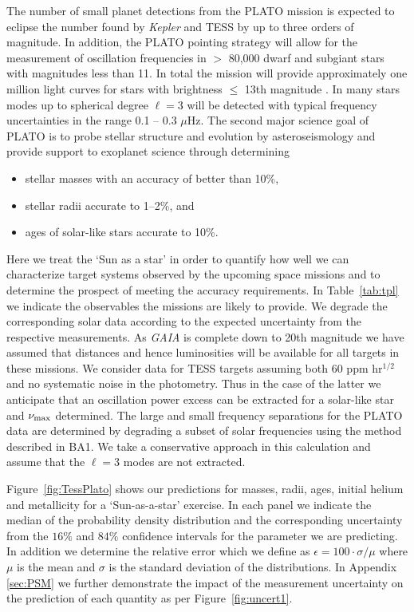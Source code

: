 The number of small planet detections from the PLATO mission is expected to eclipse the number found by \emph{Kepler}
and TESS by up to three orders of magnitude. In addition, the PLATO pointing strategy will allow for the measurement of oscillation frequencies in $>$ 80,000 dwarf and subgiant stars with magnitudes less than 11.  In total the mission will provide approximately one million light curves for stars with brightness $\le$ 13th magnitude \citep{2014ExA....38..249R}. In many stars modes up to spherical degree $\ell =3$ will be detected with typical frequency uncertainties in the range  0.1 -- 0.3 $\mu$Hz. The second major science goal of PLATO is to 
probe stellar structure and evolution by asteroseismology and provide support to exoplanet science through determining
\begin{itemize}
\item stellar masses with an accuracy of better than 10\%,
\item stellar radii accurate to 1--2\%, and
\item ages of solar-like stars accurate to 10\%.
\end{itemize}

Here we treat the `Sun as a star' in order to quantify how well we can characterize target systems observed by the 
upcoming space missions and to determine the prospect of meeting the accuracy requirements.  
In Table~\ref{tab:tpl} we indicate the observables the missions are likely to provide. 
We degrade the corresponding solar data according to the expected uncertainty from the respective measurements.   
As \emph{GAIA} is complete down to 20th magnitude we have assumed that distances and hence luminosities will be available for all targets in these missions. We consider data for TESS targets assuming both 60 ppm hr$^{1/2}$ and no systematic noise in the photometry. Thus in the case of the latter we anticipate that an oscillation power excess can be extracted for a solar-like star and $\nu_{\rm{max}}$ determined. The large and small frequency separations for the PLATO data are determined by degrading a subset of solar frequencies using the method described in BA1. We take a conservative approach in this calculation and assume that the $\ell=3$ modes are not extracted.

Figure~\ref{fig:TessPlato} shows our predictions for masses, radii, ages, initial helium and metallicity for a `Sun-as-a-star' exercise. In each panel we indicate the median of the probability density distribution and the corresponding  uncertainty from the $16\%$ and $84\%$ confidence intervals for the parameter we are predicting. In addition we determine the relative error which we define as $\epsilon = 100 \cdot \sigma/\mu$  where $\mu$ is the mean and $\sigma$ is the standard deviation of the distributions. In Appendix \ref{sec:PSM} we further demonstrate the impact of the measurement uncertainty on the prediction of each quantity as per Figure~\ref{fig:uncert1}.


